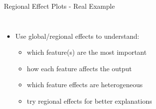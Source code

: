 \documentclass[11pt,compress,t,notes=noshow, aspectratio=169, xcolor=table,dvipsnames]{beamer}
\begin{document}
\begin{frame}{Regional Effect Plots - Real Example}
\begin{columns}
{\begin{itemize}
            \item Use global/regional effects to understand:
            \begin{itemize}
                \item which feature(s) are the most important
                \item how each feature affects the output
                \item which feature effects are heterogeneous 
                \item try regional effects for better explanations
            \end{itemize}
        \end{itemize}
        }
    \end{columns}
\end{frame}
\end{document}
